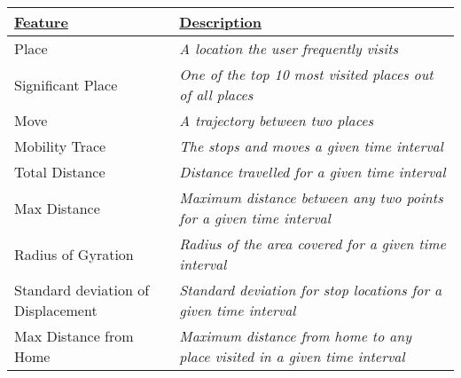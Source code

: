 \begin{table}[h]
    \centering
\begin{tabular}{|p{}|p{}|}
\hline
{\ul \textbf{Feature}}       & {\ul \textbf{Description}}                                                                                                                                        \\ \hline
Place                        & \textit{A location the user frequently visits}                                                                                                                    \\ \hline
Significant Place            & \textit{One of the top 10 most visited places out of all places}                                                                                  \\ \hline
Move                         & \textit{A trajectory between two places}                                                                                                                          \\ \hline
Mobility Trace               & \textit{The stops and moves a given time interval}                                                                                                                \\ \hline
Total Distance               & \textit{Distance travelled for a given time interval}                                                                                                             \\ \hline
Max Distance                 & \textit{Maximum distance between any two points for a given time interval}                                                                                        \\ \hline
Radius of Gyration           & \textit{Radius of the area covered for a given time interval}                                                                                                     \\ \hline
Standard deviation of Displacement         & \textit{Standard deviation for stop locations for a given time interval}                                                                                          \\ \hline
Max Distance from Home       & \textit{Maximum distance from home to any place visited in a given time interval}                                                                                 \\ \hline

\end{tabular}
\end{table}
